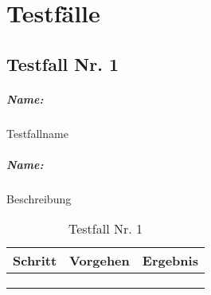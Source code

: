\chapter{Testfälle}

\section{Testfall Nr. 1}

\paragraph{Name:} Testfallname

\paragraph{Name:} Beschreibung


\begin{table}[H]
\centering
\caption{Testfall Nr. 1}
\label{tab:testf1}
\begin{center}
\begin{tabular}{|p{1.5cm}|p{5cm}|p{5cm}|}
\hline
\textbf{Schritt} & \textbf{Vorgehen} & \textbf{Ergebnis}\\
\hline
 & &\\
\hline
 & &\\
\hline
 & &\\
\hline
\end{tabular}
\end{center}
\end{table}
